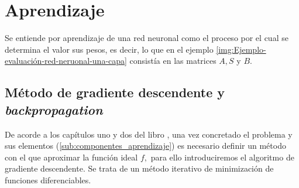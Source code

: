 \section{Aprendizaje}  

Se entiende por aprendizaje de una red neuronal como el proceso 
por el cual se determina el valor sus pesos, es decir, lo que en el ejemplo \ref{img:Ejemplo-evaluación-red-neruonal-una-capa} consistía en las matrices $A,S$ y $B$.


\subsection{Método de gradiente descendente y \textit{backpropagation}} \label{sec:gradiente-descendente}

De acorde a los capítulos uno y dos del libro  \cite{learning-from-data-1-2},
 una vez concretado el problema y sus elementos 
(\ref{sub:componentes_aprendizaje}) es necesario definir un método con 
el que aproximar la función ideal $f,$ para ello introduciremos el algoritmo de gradiente descendente. Se trata de un método iterativo de minimización de funciones diferenciables. 


\reversemarginpar
\setlength{\marginparwidth}{\smallMarginSize}
\normalmarginpar


